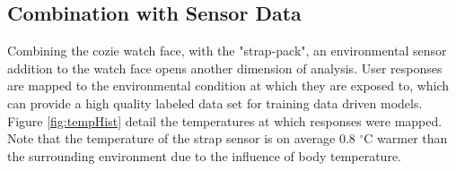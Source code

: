 \subsection{Combination with Sensor Data}

Combining the cozie watch face, with the "strap-pack", an environmental sensor addition to the watch face opens another dimension of analysis. User responses are mapped to the environmental condition at which they are exposed to, which can provide a high quality labeled data set for training data driven models. Figure \ref{fig:tempHist} detail the temperatures at which responses were mapped. Note that the temperature of the strap sensor is on average 0.8 $^\circ$C warmer than the surrounding environment due to the influence of body temperature. 